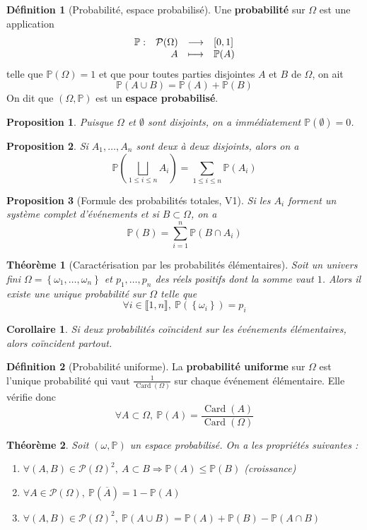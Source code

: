 \documentclass[french]{book}
\renewcommand{\P}{\mathbb{P}}
\theoremstyle{plain}
\newtheorem{thm}{Théorème}[chapter]
\newtheorem{prop}{Proposition}[chapter]
\newtheorem{cor}{Corollaire}[chapter]
\theoremstyle{definition}
\newtheorem{dfn}{Définition}[chapter]
\theoremstyle{remark}
\DeclareMathOperator{\card}{Card}
\begin{document}
\begin{dfn}[Probabilité, espace probabilisé]
	Une \textbf{probabilité} sur $\Omega$ est une application 
	$$
	\begin{array}[t]{lrcl}
		\P : & \mathcal{P}(\Omega) & \longrightarrow & [0,1] \\
		& A & \longmapsto & \P(A)
	\end{array}
	$$ telle que $\P(\Omega)=1$ et que pour toutes parties disjointes $A$ et $B$ de $\Omega$, on ait $$\P(A\cup B)=\P(A)+\P(B)$$ On dit que $(\Omega,\P)$ est un \textbf{espace probabilisé}.
\end{dfn}
\begin{prop}
	Puisque $\Omega$ et $\emptyset$ sont disjoints, on a immédiatement $\P(\emptyset)=0$.
\end{prop}
\begin{prop}
	Si $A_1,\ldots,A_n$ sont deux à deux disjoints, alors on a $$\P\left(\bigsqcup_{1\leqslant i\leqslant n} A_i\right)=\sum_{1\leqslant i\leqslant n}\P(A_i)$$
\end{prop}
\begin{prop}[Formule des probabilités totales, V1]
	Si les $A_i$ forment un système complet d'événements et si $B\subset \Omega$, on a $$\P(B)=\sum_{i=1}^{n}\P(B\cap A_i)$$
\end{prop}
\begin{thm}[Caractérisation par les probabilités élémentaires]
	Soit un univers fini $\Omega=\left\{\omega_1,\ldots,\omega_n\right\}$ et $p_1,\ldots,p_n$ des réels positifs dont la somme vaut $1$. Alors il existe une unique probabilité sur $\Omega$ telle que $$\forall i \in\llbracket1,n\rrbracket, \ \P(\left\{\omega_i\right\})=p_i$$
\end{thm}
\begin{cor}
	Si deux probabilités coïncident sur les événements élémentaires, alors coïncident partout.
\end{cor}
\begin{dfn}[Probabilité uniforme]
	La \textbf{probabilité uniforme} sur $\Omega$ est l'unique probabilité qui vaut $\displaystyle\frac{1}{\card(\Omega)}$ sur chaque événement élémentaire. Elle vérifie donc $$\forall A\subset\Omega, \ \P(A)=\frac{\card(A)}{\card(\Omega)}$$
\end{dfn}
\begin{thm}
	Soit $(\omega,\P)$ un espace probabilisé. On a les propriétés suivantes :
	\begin{enumerate}
		\item $\forall(A,B)\in\mathcal{P}(\Omega)^2, \ A\subset B \Longrightarrow \P(A)\leqslant \P(B)$ (croissance)
		\item $\forall A \in \mathcal{P}(\Omega), \ \P(\overline{A})=1-\P(A)$
		\item $\forall(A,B)\in\mathcal{P}(\Omega)^2, \ \P(A\cup B)=\P(A)+\P(B)-\P(A\cap B)$
	\end{enumerate}
\end{thm}
\end{document}
